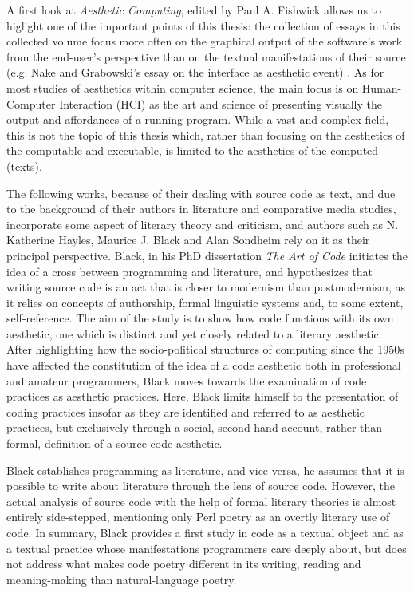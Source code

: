 A first look at \emph{Aesthetic Computing}, edited by Paul A. Fishwick allows us to higlight one of the important points of this thesis: the collection of essays in this collected volume focus more often on the graphical output of the software's work from the end-user's perspective than on the textual manifestations of their source (e.g. Nake and Grabowski's essay on the interface as aesthetic event) \citep{fishwick_aesthetic_2001}. As for most studies of aesthetics within computer science, the main focus is on Human-Computer Interaction (HCI) as the art and science of presenting visually the output and affordances of a running program. While a vast and complex field, this is not the topic of this thesis which, rather than focusing on the aesthetics of the computable and executable, is limited to the aesthetics of the computed (texts).

The following works, because of their dealing with source code as text, and due to the background of their authors in literature and comparative media studies, incorporate some aspect of literary theory and criticism, and authors such as N. Katherine Hayles, Maurice J. Black and Alan Sondheim rely on it as their principal perspective. Black, in his PhD dissertation \emph{The Art of Code} \citep{black_art_2002} initiates the idea of a cross between programming and literature, and hypothesizes that writing source code is an act that is closer to modernism than postmodernism, as it relies on concepts of authorship, formal linguistic systems and, to some extent, self-reference. The aim of the study is to show how code functions with its own aesthetic, one which is distinct and yet closely related to a literary aesthetic. After highlighting how the socio-political structures of computing since the 1950s have affected the constitution of the idea of a code aesthetic both in professional and amateur programmers, Black moves towards the examination of code practices as aesthetic practices. Here, Black limits himself to the presentation of coding practices insofar as they are identified and referred to as aesthetic practices, but exclusively through a social, second-hand account, rather than formal, definition of a source code aesthetic.

Black  establishes programming as literature, and vice-versa, he assumes that it is possible to write about literature through the lens of source code. However, the actual analysis of source code with the help of formal literary theories is almost entirely side-stepped, mentioning only Perl poetry as an overtly literary use of code. In summary, Black provides a first study in code as a textual object and as a textual practice whose manifestations programmers care deeply about, but does not address what makes code poetry different in its writing, reading and meaning-making than natural-language poetry.

